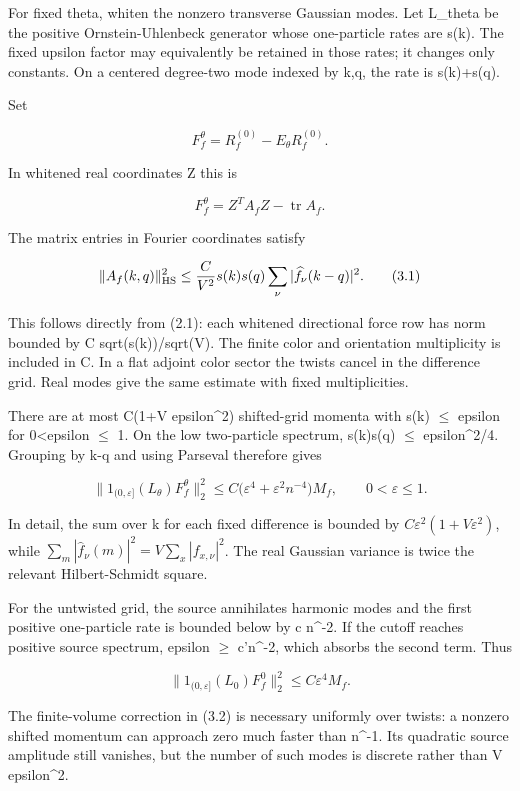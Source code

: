 \documentclass[
  11pt,
]{article}
\begin{document}
For fixed theta, whiten the nonzero transverse Gaussian modes. Let
L\_theta be the positive Ornstein-Uhlenbeck generator whose one-particle
rates are s(k). The fixed upsilon factor may equivalently be retained in
those rates; it changes only constants. On a centered degree-two mode
indexed by k,q, the rate is s(k)+s(q).

Set

\[
 F_f^{\theta}=R_f^{(0)}-E_\theta R_f^{(0)}.
\]

In whitened real coordinates Z this is

\[
 F_f^{\theta}=Z^TA_fZ-\operatorname{tr}A_f.
\]

The matrix entries in Fourier coordinates satisfy

\[
 \|A_f(k,q)\|_{\rm HS}^2
 \le\frac{C}{V^2}s(k)s(q)
             \sum_\nu|\widehat f_\nu(k-q)|^2.
\tag{3.1}
\]

This follows directly from (2.1): each whitened directional force row
has norm bounded by C sqrt(s(k))/sqrt(V). The finite color and
orientation multiplicity is included in C. In a flat adjoint color
sector the twists cancel in the difference grid. Real modes give the
same estimate with fixed multiplicities.

There are at most C(1+V epsilon\^{}2) shifted-grid momenta with s(k)
\(\leq\) epsilon for 0\textless epsilon \(\leq\) 1. On the low
two-particle spectrum, s(k)s(q) \(\leq\) epsilon\^{}2/4. Grouping by k-q
and using Parseval therefore gives

\[
 \boxed{\quad
 \|1_{(0,\varepsilon]}(L_\theta)F_f^{\theta}\|_2^2
 \le C\bigl(\varepsilon^4+\varepsilon^2n^{-4}\bigr)M_f,
 \qquad 0<\varepsilon\le1.
 \quad}
\tag{3.2}
\]

In detail, the sum over k for each fixed difference is bounded by
\(C\varepsilon^2(1+V\varepsilon^2)\), while
\(\sum_m|\widehat f_\nu(m)|^2=V\sum_x|f_{x,\nu}|^2\). The real Gaussian
variance is twice the relevant Hilbert-Schmidt square.

For the untwisted grid, the source annihilates harmonic modes and the
first positive one-particle rate is bounded below by c n\^{}-2. If the
cutoff reaches positive source spectrum, epsilon \(\geq\) c'n\^{}-2,
which absorbs the second term. Thus

\[
 \boxed{\quad
 \|1_{(0,\varepsilon]}(L_0)F_f^{0}\|_2^2
 \le C\varepsilon^4M_f.
 \quad}
\tag{3.3}
\]

The finite-volume correction in (3.2) is necessary uniformly over
twists: a nonzero shifted momentum can approach zero much faster than
n\^{}-1. Its quadratic source amplitude still vanishes, but the number
of such modes is discrete rather than V epsilon\^{}2.
\end{document}
